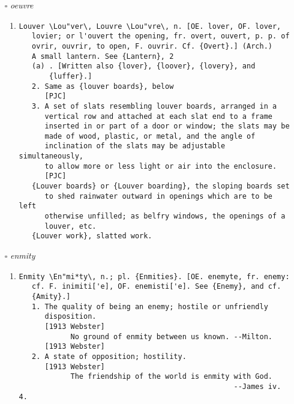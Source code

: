\documentclass{article}
\begin{document}
\begin{itemize}
\begin{enumerate}
\item{
\begin{lstlisting}
Flocculent \Floc"cu*lent\, a. [See {Flock} of wool.]
   1. Clothed with small flocks or flakes; woolly. --Gray.
      [1913 Webster]
   2. (Zo["o]l.) Applied to the down of newly hatched or
      unfledged birds.
      [1913 Webster]
   3. (Chem.) Having a structure like shredded wool, as some
      precipitates.
      [Webster 1913 Suppl.]
\end{lstlisting}}
\end{enumerate}
\item[$\square$] \emph{ oeuvre }
\begin{enumerate}
\item{
\begin{lstlisting}
Louver \Lou"ver\, Louvre \Lou"vre\, n. [OE. lover, OF. lover,
   lovier; or l'ouvert the opening, fr. overt, ouvert, p. p. of
   ovrir, ouvrir, to open, F. ouvrir. Cf. {Overt}.] (Arch.)
   A small lantern. See {Lantern}, 2
   (a) . [Written also {lover}, {loover}, {lovery}, and
       {luffer}.]
   2. Same as {louver boards}, below
      [PJC]
   3. A set of slats resembling louver boards, arranged in a
      vertical row and attached at each slat end to a frame
      inserted in or part of a door or window; the slats may be
      made of wood, plastic, or metal, and the angle of
      inclination of the slats may be adjustable simultaneously,
      to allow more or less light or air into the enclosure.
      [PJC]
   {Louver boards} or {Louver boarding}, the sloping boards set
      to shed rainwater outward in openings which are to be left
      otherwise unfilled; as belfry windows, the openings of a
      louver, etc.
   {Louver work}, slatted work.
\end{lstlisting}}
\end{enumerate}
\item[$\square$] \emph{ enmity }
\begin{enumerate}
\item{
\begin{lstlisting}
Enmity \En"mi*ty\, n.; pl. {Enmities}. [OE. enemyte, fr. enemy:
   cf. F. inimiti['e], OF. enemisti['e]. See {Enemy}, and cf.
   {Amity}.]
   1. The quality of being an enemy; hostile or unfriendly
      disposition.
      [1913 Webster]
            No ground of enmity between us known. --Milton.
      [1913 Webster]
   2. A state of opposition; hostility.
      [1913 Webster]
            The friendship of the world is enmity with God.
                                                  --James iv. 4.

\end{lstlisting}}
\end{enumerate}
\end{itemize}
\end{document}
